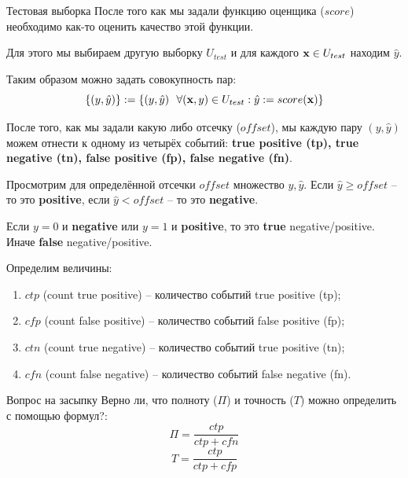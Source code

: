 	\begin{frame}{Тестовая выборка}
	После того как мы задали функцию оценщика ($score$)
	необходимо как-то оценить качество этой функции.
	
	Для этого мы выбираем другую выборку $U_{test}$ и для каждого $\bold x \in U_{test}$ 
	находим $\hat y$. 
	
	Таким образом можно задать совокупность пар:
	\begin{equation}
	\{(y, \hat y)\} := \left\{ (y, \hat y)~~\forall (\bold x, y) \in U_{test} : \hat y := score(\bold x) \right\} 
	\end{equation}
	
	После того, как мы задали какую либо отсечку ($offset$), мы каждую пару $(y, \hat y)$ можем отнести к одному из четырёх 
	событий: \textbf{true positive (tp), true negative (tn), false positive (fp), false negative (fn)}.
		
	\end{frame}

	\begin{frame}
	Просмотрим для определённой отсечки $offset$
	множество ${y, \hat y}$. 
	Если $\hat y \geqslant offset$ -- то это \textbf{positive}, 
	если $\hat y < offset$ -- то это \textbf{negative}.
	
	Если $y=0$ и \textbf{negative} или $y=1$ и \textbf{positive}, то это \textbf{true} negative/positive.
	Иначе \textbf{false}  negative/positive.
	
	Определим величины:
	\begin{enumerate}
		\item $ctp$ (count true positive) -- количество событий true positive (tp);
		\item $cfp$ (count false positive) -- количество событий false positive (fp);
		\item $ctn$ (count true negative) -- количество событий true positive (tn);
		\item $cfn$ (count false negative) -- количество событий false negative (fn).
	\end{enumerate}
	\end{frame}

	\begin{frame}{Вопрос на засыпку}
	Верно ли, что полноту ($\Pi$) и точность ($T$) можно определить с помощью формул?:
	\begin{equation*}
	\Pi = \frac{ctp}{ctp + cfn}
	\end{equation*}
	\begin{equation*}
	T = \frac{ctp}{ctp + cfp}
	\end{equation*}
	\end{frame}

